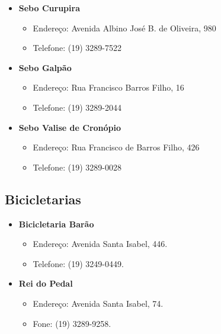 \begin{itemize}
\item  \textbf{Sebo Curupira}
\begin{itemize}
\item  Endereço: Avenida Albino José B. de Oliveira, 980
\item  Telefone: (19) 3289-7522
\end{itemize}
\end{itemize}

\begin{itemize}
\item  \textbf{Sebo Galpão}
\begin{itemize}
\item  Endereço: Rua Francisco Barros Filho, 16
\item  Telefone: (19) 3289-2044
\end{itemize}
\end{itemize}

\begin{itemize}
\item  \textbf{Sebo Valise de Cronópio}
\begin{itemize}
\item  Endereço: Rua Francisco de Barros Filho, 426
\item  Telefone: (19) 3289-0028
\end{itemize}
\end{itemize}

\subsection{Bicicletarias}

\begin{itemize}
\item  \textbf{Bicicletaria Barão}
\begin{itemize}
\item  Endereço: Avenida Santa Isabel, 446.
\item  Telefone: (19) 3249-0449.
\end{itemize}
\end{itemize}

\begin{itemize}
\item  \textbf{Rei do Pedal}
\begin{itemize}
\item  Endereço: Avenida Santa Isabel, 74.
\item  Fone: (19) 3289-9258.
\end{itemize}
\end{itemize}

